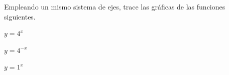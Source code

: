 \item Empleando un mismo sistema de ejes, trace las gráficas de las funciones siguientes.
\begin{enumerate}
    \begin{minipage}{0.3\textwidth}
    \item[(a)] $y = 4^x$
    \end{minipage}%
    \begin{minipage}{0.3\textwidth}
    \item[(b)] $y = 4^{-x}$
    \end{minipage}%
    \begin{minipage}{0.3\textwidth}
    \item[(c)] $y = 1^x$
    \end{minipage}
\end{enumerate}
